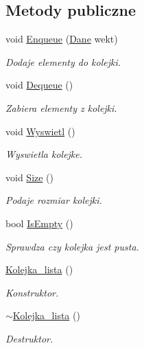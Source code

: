 \subsection*{\-Metody publiczne}
\begin{DoxyCompactItemize}
\item 
void \hyperlink{class_kolejka__lista_a3e63e0b83cb517c96f4f7dd4d76f0b4a}{\-Enqueue} (\hyperlink{class_dane}{\-Dane} wekt)
\begin{DoxyCompactList}\small\item\em \-Dodaje elementy do kolejki. \end{DoxyCompactList}\item 
void \hyperlink{class_kolejka__lista_a3f8aa633abaf480d1481743ac8c018e8}{\-Dequeue} ()
\begin{DoxyCompactList}\small\item\em \-Zabiera elementy z kolejki. \end{DoxyCompactList}\item 
void \hyperlink{class_kolejka__lista_a585d53932d7b03c12e8b15ca85dbc461}{\-Wyswietl} ()
\begin{DoxyCompactList}\small\item\em \-Wyswietla kolejke. \end{DoxyCompactList}\item 
void \hyperlink{class_kolejka__lista_abfa4fa22942429969deb67e1b72eeba7}{\-Size} ()
\begin{DoxyCompactList}\small\item\em \-Podaje rozmiar kolejki. \end{DoxyCompactList}\item 
bool \hyperlink{class_kolejka__lista_ae6334aa04280714bc907fc1c6d7b0ffd}{\-Is\-Empty} ()
\begin{DoxyCompactList}\small\item\em \-Sprawdza czy kolejka jest pusta. \end{DoxyCompactList}\item 
\hyperlink{class_kolejka__lista_a7208c60729540ca7b9099987dda7bc7b}{\-Kolejka\-\_\-lista} ()
\begin{DoxyCompactList}\small\item\em \-Konstruktor. \end{DoxyCompactList}\item 
\hyperlink{class_kolejka__lista_af84680ce033e41ef9688e432a0934fa9}{$\sim$\-Kolejka\-\_\-lista} ()
\begin{DoxyCompactList}\small\item\em \-Destruktor. \end{DoxyCompactList}\end{DoxyCompactItemize}


